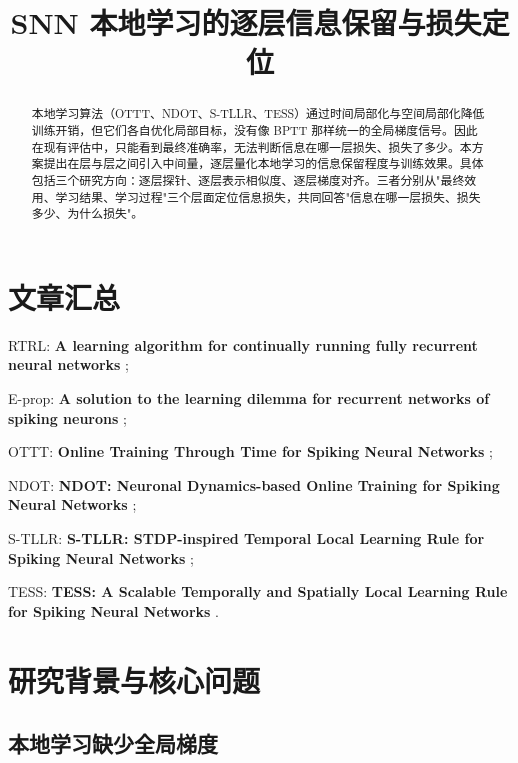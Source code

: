 \documentclass[journal,12pt,onecolumn]{IEEEtran}
\begin{document}
\title{SNN 本地学习的逐层信息保留与损失定位}

\author{}
\date{}

\maketitle

\begin{abstract}
本地学习算法（OTTT、NDOT、S-TLLR、TESS）通过时间局部化与空间局部化降低训练开销，但它们各自优化局部目标，没有像 BPTT 那样统一的全局梯度信号。因此在现有评估中，只能看到最终准确率，无法判断信息在哪一层损失、损失了多少。本方案提出在层与层之间引入中间量，逐层量化本地学习的信息保留程度与训练效果。具体包括三个研究方向：逐层探针、逐层表示相似度、逐层梯度对齐。三者分别从"最终效用、学习结果、学习过程"三个层面定位信息损失，共同回答"信息在哪一层损失、损失多少、为什么损失"。
\end{abstract}

\section*{文章汇总}

RTRL: \textbf{A learning algorithm for continually running fully recurrent neural networks} \cite{williams1989learning};

E-prop: \textbf{A solution to the learning dilemma for recurrent networks of spiking neurons} \cite{bellec_solution_2020};

OTTT: \textbf{Online Training Through Time for Spiking Neural Networks} \cite{xiao_online_2022};

NDOT: \textbf{NDOT: Neuronal Dynamics-based Online Training for Spiking Neural Networks} \cite{jiang_ndot_nodate};

S-TLLR: \textbf{S-TLLR: STDP-inspired Temporal Local Learning Rule for Spiking Neural Networks} \cite{apolinario_s-tllr_2024};

TESS: \textbf{TESS: A Scalable Temporally and Spatially Local Learning Rule for Spiking Neural Networks} \cite{apolinario_tess_2025}.


\section{研究背景与核心问题}

\subsection{本地学习缺少全局梯度}
\end{document}
